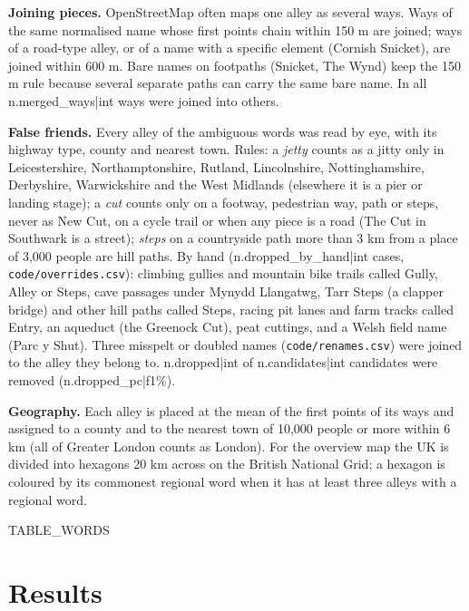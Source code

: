 \documentclass[11pt,a4paper]{article}
\begin{document}
\textbf{Joining pieces.} OpenStreetMap often maps one alley as several ways. Ways of the same normalised name whose first points chain within 150 m are joined; ways of a road-type alley, or of a name with a specific element (Cornish Snicket), are joined within 600 m. Bare names on footpaths (Snicket, The Wynd) keep the 150 m rule because several separate paths can carry the same bare name. In all {{n.merged_ways|int}} ways were joined into others.

\textbf{False friends.} Every alley of the ambiguous words was read by eye, with its highway type, county and nearest town. Rules: a \textit{jetty} counts as a jitty only in Leicestershire, Northamptonshire, Rutland, Lincolnshire, Nottinghamshire, Derbyshire, Warwickshire and the West Midlands (elsewhere it is a pier or landing stage); a \textit{cut} counts only on a footway, pedestrian way, path or steps, never as New Cut, on a cycle trail or when any piece is a road (The Cut in Southwark is a street); \textit{steps} on a countryside path more than 3 km from a place of 3,000 people are hill paths. By hand ({{n.dropped_by_hand|int}} cases, \texttt{code/overrides.csv}): climbing gullies and mountain bike trails called Gully, Alley or Steps, cave passages under Mynydd Llangatwg, Tarr Steps (a clapper bridge) and other hill paths called Steps, racing pit lanes and farm tracks called Entry, an aqueduct (the Greenock Cut), peat cuttings, and a Welsh field name (Parc y Shut). Three misspelt or doubled names (\texttt{code/renames.csv}) were joined to the alley they belong to. {{n.dropped|int}} of {{n.candidates|int}} candidates were removed ({{n.dropped_pc|f1}}\%).

\textbf{Geography.} Each alley is placed at the mean of the first points of its ways and assigned to a county and to the nearest town of 10,000 people or more within 6 km (all of Greater London counts as London). For the overview map the UK is divided into hexagons 20 km across on the British National Grid; a hexagon is coloured by its commonest regional word when it has at least three alleys with a regional word.

{{TABLE_WORDS}}

\section{Results}
\end{document}

